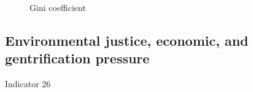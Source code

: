 \documentclass[
  letterpaper,
  oneside,
  open=any]{scrbook}
\begin{document}
\begin{figure}


\caption{\label{fig-gini}Gini coefficient}

\end{figure}%

\subsection{Environmental justice, economic, and gentrification
pressure}\label{environmental-justice-economic-and-gentrification-pressure}

Indicator 26
\end{document}
